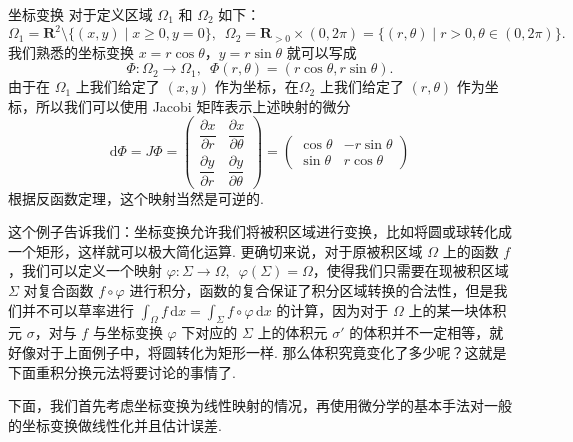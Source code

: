 \begin{example}{坐标变换}{}
    对于定义区域 $\Omega_1$ 和 $\Omega_2$ 如下：
    \[\Omega_1 = \mathbf{R}^2\setminus\{(x, y) \mid x\geqslant 0, y = 0\},\enspace \Omega_2 = \mathbf{R}_{>0}\times (0, 2\pi) = \{(r, \theta) \mid r>0, \theta\in(0, 2\pi)\}.\]
    我们熟悉的坐标变换 $x = r\cos\theta$，$y = r\sin\theta$ 就可以写成 \[\Phi\colon \Omega_2\to\Omega_1,\enspace \Phi(r, \theta) = (r\cos\theta, r\sin\theta).\]
    由于在 $\Omega_1$ 上我们给定了 $(x, y)$ 作为坐标，在$\Omega_2$ 上我们给定了 $(r, \theta)$ 作为坐标，所以我们可以使用 Jacobi 矩阵表示上述映射的微分
    \[
        \mathrm{d}\Phi = J\Phi = \begin{pmatrix}
            \dfrac{\partial x}{\partial r} & \dfrac{\partial x}{\partial \theta} \\[2ex]
            \dfrac{\partial y}{\partial r} & \dfrac{\partial y}{\partial \theta}
        \end{pmatrix} = \begin{pmatrix}
            \cos\theta & -r\sin\theta \\
            \sin\theta & r\cos\theta
        \end{pmatrix}
    \]
    根据反函数定理，这个映射当然是可逆的.
\end{example}

这个例子告诉我们：坐标变换允许我们将被积区域进行变换，比如将圆或球转化成一个矩形，这样就可以极大简化运算. 更确切来说，对于原被积区域 $\Omega$ 上的函数 $f$，我们可以定义一个映射 $\varphi\colon \Sigma \to \Omega,\enspace \varphi(\Sigma) = \Omega$，使得我们只需要在现被积区域 $\Sigma$ 对复合函数 $f\circ\varphi$ 进行积分，函数的复合保证了积分区域转换的合法性，但是我们并不可以草率进行 \vspace{2ex}$\displaystyle\int_{\Omega}f\,\mathrm{d}x = \int_{\Sigma}f\circ \varphi\,\mathrm{d}x$ 的计算，因为对于 $\Omega$ 上的某一块体积元 $\sigma$，对与 $f$ 与坐标变换 $\varphi$ 下对应的 $\Sigma$ 上的体积元 $\sigma'$ 的体积并不一定相等，就好像对于上面例子中，将圆转化为矩形一样. 那么体积究竟变化了多少呢？这就是下面重积分换元法将要讨论的事情了. %

下面，我们首先考虑坐标变换为线性映射的情况，再使用微分学的基本手法对一般的坐标变换做线性化并且估计误差.


